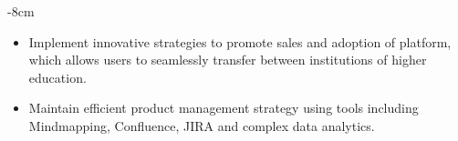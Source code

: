 \documentclass[10pt,a4paper]{altacv}
\begin{document}

\begin{adjustwidth}{}{-8cm}
\makecvheader
\end{adjustwidth}

\begin{itemize}
\item Implement innovative strategies to promote sales and adoption of platform, which allows users to seamlessly transfer between institutions of higher education.
\item Maintain efficient product management strategy using tools including Mindmapping, Confluence, JIRA and complex data analytics.
\end{itemize}
\divider
\end{document}
